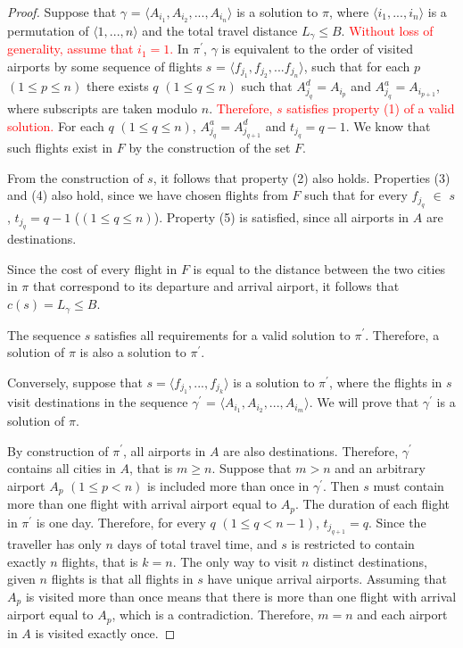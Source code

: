 \documentclass{mprop}
\theoremstyle{definition}
\begin{document}
\begin{proof}
Suppose that $\gamma$ = $ \langle A_{i_{1}}, A_{i_{2}},...,A_{i_{n}} \rangle $ is a solution to $\pi$, where $\langle i_{1},...,i_{n} \rangle$ is a permutation of $\langle 1,...,n \rangle $ and the total travel distance $L_{\gamma} \leq B$. \textcolor{red}{Without loss of generality, assume that $i_{1} = 1$.} In $\pi^{\prime}$, $\gamma$ is equivalent to the order of visited airports by some sequence of flights $s$ = $ \langle f_{j_{1}}, f_{j_{2}},...f_{j_{n}} \rangle $, such that for each $p$  $(1 \leq p \leq n)$ there exists $q$ $(1 \leq q \leq n)$ such that $A^{d}_{j_{q}} = A_{i_{p}}$ and $A^{a}_{j_{q}} = A_{i_{p+1}}$, where subscripts are taken modulo $n$. \textcolor{red}{Therefore, $s$ satisfies property (1) of a valid solution.} For each $q$ $(1 \leq q \leq n)$, $A^{a}_{j_{q}} = A^{d}_{j_{q+1}}$ and $t_{j_{q}} = q - 1$.  We know that such flights exist in $F$ by the construction of the set $F$.

From the construction of $s$, it follows that property (2) also holds. Properties (3) and (4) also hold, since we have chosen flights from $F$ such that for every $f_{j_{q}}$ $\in$ $s$, $t_{j_{q}} = q - 1$ ($(1 \leq q \leq n)$). Property (5) is satisfied, since all airports in $A$ are destinations.

Since the cost of every flight in $F$ is equal to the distance between the two cities in $\pi$ that correspond to its departure and arrival airport, it follows that $c(s) = L_{\gamma} \leq B$.

The sequence $s$ satisfies all requirements for a valid solution to $\pi^{\prime}$. Therefore, a solution of $\pi$ is also a solution to $\pi^{\prime}$.

Conversely, suppose that $s = \langle f_{j_{1}},...,f_{j_{k}} \rangle $ is a solution to $\pi^{\prime}$, where the flights in $s$ visit destinations in the sequence $\gamma^{\prime}$ = $\langle A_{i_{1}}, A_{i_{2}},...,A_{i_{m}} \rangle$. We will prove that $\gamma^{\prime}$ is a solution of $\pi$.

By construction of $\pi^{\prime}$, all airports in $A$ are also destinations. Therefore, $\gamma^{\prime}$ contains all cities in $A$, that is $m \geq n$. Suppose that $m > n$ and an arbitrary airport $A_{p}$ $(1 \leq p < n)$ is included more than once in $\gamma^{\prime}$. Then $s$ must contain more than one flight with arrival airport equal to $A_{p}$. 
The duration of each flight in $\pi^{\prime}$ is one day. Therefore, for every $q$ $(1 \leq q < n - 1)$, $t_{j_{q+1}} = q$. Since the traveller has only $n$ days of total travel time, and $s$ is restricted to contain exactly $n$ flights, that is $k = n$. The only way to visit $n$ distinct destinations, given $n$ flights is that all flights in $s$ have unique arrival airports. Assuming that $A_{p}$ is visited more than once means that there is more than one flight with arrival airport equal to $A_{p}$, which is a contradiction. Therefore, $m = n$ and each airport in $A$ is visited exactly once.


\end{proof}
\end{document}
